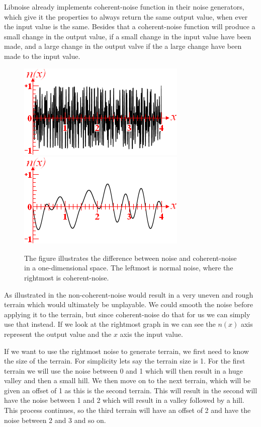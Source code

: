 Libnoise already implements coherent-noise function in their noise generators, which give it the properties to always return the same output value, when ever the input value is the same. Besides that a coherent-noise function will produce a small change in the output value, if a small change in the input value have been made, and a large change in the output valve if the a large change have been made to the input value\cite{coherentnoise}.

\begin{figure}[H]
		\includegraphics[width=0.49\linewidth]{img/noise}\includegraphics[width=0.49\linewidth]{img/coherentnoise}
		\centering
		\caption{The figure illustrates the difference between noise and coherent-noise in a one-dimensional space. The leftmost is normal noise, where the rightmost is coherent-noise.}
		\label{fig:noise}
\end{figure}

As illustrated in  the non-coherent-noise would result in a very uneven and rough terrain which would ultimately be unplayable. We could smooth the noise before applying it to the terrain, but since coherent-noise do that for us we can simply use that instead. If we look at the rightmost graph in  we can see the $n(x)$ axis represent the output value and the $x$ axis the input value.

If we want to use the rightmost noise to generate terrain, we first need to know the size of the terrain. For simplicity lets say the terrain size is 1. For the first terrain we will use the noise between 0 and 1 which will then result in a huge valley and then a small hill. We then move on to the next terrain, which will be given an offset of 1 as this is the second terrain. This will result in the second will have the noise between 1 and 2 which will result in a valley followed by a hill. This process continues, so the third terrain will have an offset of 2 and have the noise between 2 and 3 and so on.


